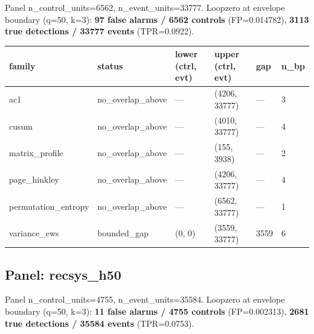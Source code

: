 \documentclass[
  11pt,
]{article}
\newcounter{none} %
\begin{document}
Panel n\_control\_units=6562, n\_event\_units=33777. Loopzero at
envelope boundary (q=50, k=3): \textbf{97 false alarms / 6562 controls}
(FP=0.014782), \textbf{3113 true detections / 33777 events}
(TPR=0.0922).

{\def\LTcaptype{none} %
\begin{longtable}[]{@{}llllll@{}}
\toprule\noalign{}
family & status & lower (ctrl, evt) & upper (ctrl, evt) & gap & n\_bp \\
\midrule\noalign{}
\endhead
\bottomrule\noalign{}
\endlastfoot
ac1 & no\_overlap\_above & --- & (4206, 33777) & --- & 3 \\
cusum & no\_overlap\_above & --- & (4010, 33777) & --- & 4 \\
matrix\_profile & no\_overlap\_above & --- & (155, 3938) & --- & 2 \\
page\_hinkley & no\_overlap\_above & --- & (4206, 33777) & --- & 4 \\
permutation\_entropy & no\_overlap\_above & --- & (6562, 33777) & --- &
1 \\
variance\_ews & bounded\_gap & (0, 0) & (3559, 33777) & 3559 & 6 \\
\end{longtable}
}

\subsection{Panel: recsys\_h50}\label{panel-recsys_h50}

Panel n\_control\_units=4755, n\_event\_units=35584. Loopzero at
envelope boundary (q=50, k=3): \textbf{11 false alarms / 4755 controls}
(FP=0.002313), \textbf{2681 true detections / 35584 events}
(TPR=0.0753).
\end{document}
